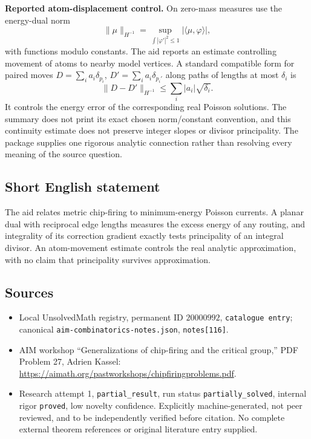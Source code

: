 \documentclass[11pt]{article}
\begin{document}
\textbf{Reported atom-displacement control.} On zero-mass measures use the energy-dual norm
\[
 \|\mu\|_{H^{-1}}=\sup_{\int|\varphi'|^2\leq1}|\langle\mu,\varphi\rangle|,
\]
with functions modulo constants. The aid reports an estimate controlling movement of atoms to nearby model vertices. A standard compatible form for paired moves $D=\sum_i a_i\delta_{p_i}$, $D'=\sum_i a_i\delta_{p_i'}$ along paths of lengths at most $\delta_i$ is
\[
 \|D-D'\|_{H^{-1}}\leq\sum_i|a_i|\sqrt{\delta_i}.
\]
It controls the energy error of the corresponding real Poisson solutions. The summary does not print its exact chosen norm/constant convention, and this continuity estimate does not preserve integer slopes or divisor principality. The package supplies one rigorous analytic connection rather than resolving every meaning of the source question.
\subsection{Short English statement}
The aid relates metric chip-firing to minimum-energy Poisson currents. A planar dual with reciprocal edge lengths measures the excess energy of any routing, and integrality of its correction gradient exactly tests principality of an integral divisor. An atom-movement estimate controls the real analytic approximation, with no claim that principality survives approximation.
\subsection{Sources}
\begin{itemize}
\item Local UnsolvedMath registry, permanent ID $20000992$, \texttt{catalogue entry}; canonical \texttt{aim-combinatorics-notes.json}, \texttt{notes[116]}.
\item AIM workshop ``Generalizations of chip-firing and the critical group,'' PDF Problem 27, Adrien Kassel: \url{https://aimath.org/pastworkshops/chipfiringproblems.pdf}.
\item Research attempt 1, \texttt{partial\_result}, run status \texttt{partially\_solved}, internal rigor \texttt{proved}, low novelty confidence. Explicitly machine-generated, not peer reviewed, and to be independently verified before citation. No complete external theorem references or original literature entry supplied.
\end{itemize}
\end{document}
